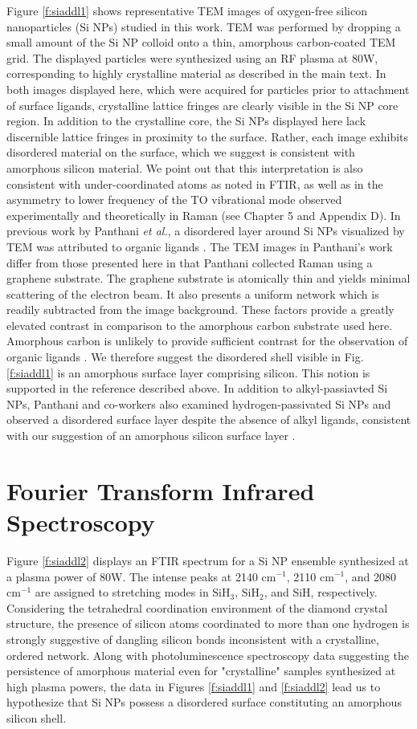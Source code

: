 Figure \ref{f:siaddl1} shows representative TEM images of oxygen-free silicon nanoparticles (Si NPs) studied in this work. TEM was performed by dropping a small amount of the Si NP colloid onto a thin, amorphous carbon-coated TEM grid. The displayed particles were synthesized using an RF plasma at 80W, corresponding to highly crystalline material as described in the main text. In both images displayed here, which were acquired for particles prior to attachment of surface ligands, crystalline lattice fringes are clearly visible in the Si NP core region. In addition to the crystalline core, the Si NPs displayed here lack discernible lattice fringes in proximity to the surface. Rather, each image exhibits disordered material on the surface, which we suggest is consistent with amorphous silicon material. We point out that this interpretation is also consistent with under-coordinated atoms as noted in FTIR, as well as in the asymmetry to lower frequency of the TO vibrational mode observed experimentally and theoretically in Raman (see Chapter 5 and Appendix D). In previous work by Panthani \emph{et al.}, a disordered layer around Si NPs visualized by TEM was attributed to organic ligands \cite{panthani2012graphene}. The TEM images in Panthani's work differ from those presented here in that Panthani collected Raman using a graphene substrate. The graphene substrate is atomically thin and yields minimal scattering of the electron beam. It also presents a uniform network which is readily subtracted from the image background. These factors provide a greatly elevated contrast in comparison to the amorphous carbon substrate used here. Amorphous carbon is unlikely to provide sufficient contrast for the observation of organic ligands \cite{panthani2012graphene}. We therefore suggest the disordered shell visible in Fig. \ref{f:siaddl1} is an amorphous surface layer comprising silicon. This notion is supported in the reference described above. In addition to alkyl-passiavted Si NPs, Panthani and co-workers also examined hydrogen-passivated Si NPs and observed a disordered surface layer despite the absence of alkyl ligands, consistent with our suggestion of an amorphous silicon surface layer \cite{panthani2012graphene}.

\section{Fourier Transform Infrared Spectroscopy}
Figure \ref{f:siaddl2} displays an FTIR spectrum for a Si NP ensemble synthesized at a plasma power of 80W. The intense peaks at 2140 cm$^{-1}$, 2110 cm$^{-1}$, and 2080 cm$^{-1}$ are assigned to stretching modes in SiH$_3$, SiH$_2$, and SiH, respectively. Considering the tetrahedral coordination environment of the diamond crystal structure, the presence of silicon atoms coordinated to more than one hydrogen is strongly suggestive of dangling silicon bonds inconsistent with a crystalline, ordered network. Along with photoluminescence spectroscopy data suggesting the persistence of amorphous material even for "crystalline" samples synthesized at high plasma powers, the data in Figures \ref{f:siaddl1} and \ref{f:siaddl2} lead us to hypothesize that Si NPs possess a disordered surface constituting an amorphous silicon shell. 

